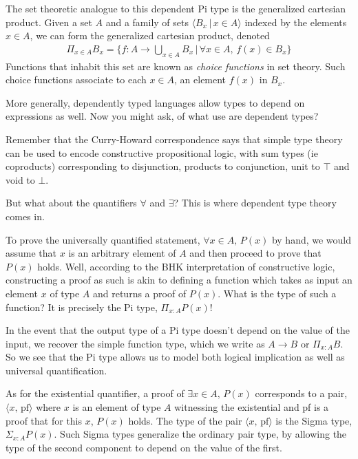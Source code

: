 \documentclass{article}
\begin{document}
The set theoretic analogue to this dependent Pi type is the generalized
cartesian product. Given a set $A$ and a family of sets $\langle B_x \, | \, x
\in A\rangle$ indexed by the
elements $x \in A$, we can form the generalized cartesian product, denoted
\begin{align*}
  \Pi_{x \in A} B_x = \bigg\{ f : A \rightarrow \bigcup_{x \in A} B_x \, | \, \forall x \in A, \, f(x) \in B_x \bigg\}
\end{align*}
Functions that inhabit this set are known as \textit{choice functions} in set
theory. Such choice functions associate to each $x \in A$, an element $f(x)$ in $B_x$.

More generally, dependently typed languages allow types to depend on expressions
as well.
Now you might ask, of what use are dependent types?

Remember that the Curry-Howard correspondence says that simple type theory
can be used to encode constructive propositional logic,
with sum types (ie coproducts) corresponding to disjunction, products to 
conjunction, unit to $\top$ and void to $\bot$.

But what about the quantifiers $\forall$ and $\exists$?
This is where dependent type theory comes in.

To prove the universally quantified statement, $\forall x \in A, \, P(x)$ by hand,
we would assume that $x$ is an arbitrary element of $A$ and then proceed to prove
that $P(x)$ holds.
Well, according to the BHK interpretation of constructive logic, constructing
a proof as such is akin to defining a function which takes 
as input an element $x$ of type $A$ and returns a proof of $P(x)$.
What is the type of such a function? It is precisely the Pi type, 
$\Pi_{x : A} P(x)$!

In the event that the output type of a Pi type doesn't depend on the value of the
input, we recover the simple function type, which we write as $A \rightarrow B$
or $\Pi_{x : A} B$. So we see that the Pi type allows us to model both
logical implication as well as universal quantification. 

As for the existential quantifier, a proof of $\exists x \in A, \, P(x)$
corresponds to a pair, $\langle x, \, \text{pf} \rangle$ where $x$ is an element
of type $A$ witnessing the existential and pf is a proof that for this $x$, 
$P(x)$ holds. The type of the pair $\langle x, \, \text{pf}\rangle$ is the
Sigma type, $\Sigma_{x : A} P(x)$. Such Sigma types generalize the ordinary pair
type, by allowing the type of the second component to depend on the value of
the first. 
\end{document}
